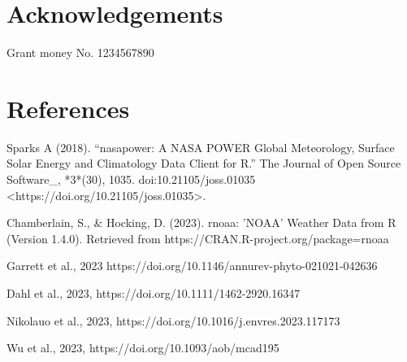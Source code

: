 \documentclass[11pt, oneside]{article}   	%
\begin{document}
\section*{Acknowledgements}
Grant money No. 1234567890

\section*{References}
Sparks A (2018). “nasapower: A NASA POWER Global Meteorology, Surface Solar Energy and
  Climatology Data Client for R.” The Journal of Open Source Software_, *3*(30), 1035.
  doi:10.21105/joss.01035 <https://doi.org/10.21105/joss.01035>.

Chamberlain, S., & Hocking, D. (2023). rnoaa: 'NOAA' Weather Data from R (Version 1.4.0). Retrieved from https://CRAN.R-project.org/package=rnoaa

Garrett et al., 2023 https://doi.org/10.1146/annurev-phyto-021021-042636

Dahl et al., 2023,  https://doi.org/10.1111/1462-2920.16347

Nikolauo et al., 2023, https://doi.org/10.1016/j.envres.2023.117173

Wu et al., 2023, https://doi.org/10.1093/aob/mcad195
\end{document}
